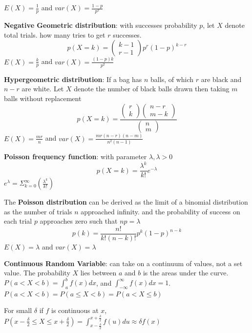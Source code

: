 \documentclass{article}
\begin{document}
\begin{multicols*}{2}
    $E(X) = \frac{1}{p}$ and $var(X) = \frac{1-p}{p^2}$

    \textbf{Negative Geometric distribution}: with successes probability $p$, let $X$ denote total trials. how many tries to get $r$ successes.
    \[
        p(X=k) = \begin{pmatrix}
            k-1 \\
            r-1
        \end{pmatrix} p^r \left( 1-p \right)^{k-r}
    \]
    $E(X) = \frac{k}{p}$ and $var(X) = \frac{(1-p)k}{p^2}$

    \textbf{Hypergeometric distribution}: If a bag has $n$ balls, of which $r$ are black and $n-r$ are white.
    Let $X$ denote the number of black balls drawn then taking $m$ balls without replacement
    \[
        p(X=k) =\frac{ \begin{pmatrix}
                r \\
                k
            \end{pmatrix} \begin{pmatrix}
                n-r \\
                m-k
            \end{pmatrix}}{ \begin{pmatrix}
                n \\
                m
            \end{pmatrix}}
    \]
    $E(X) = \frac{mr}{n}$ and $var(X) = \frac{mr(n-r)(n-m)}{n^2(n-1)}$

    \textbf{Poisson frequency function}: with parameter $\lambda, \lambda > 0$
    \[
        p(X=k) = \frac{\lambda^k}{k!}e^{-\lambda}
    \]
    $e^\lambda = \Sigma^\infty_{k=0} \left(\frac{\lambda^k}{k!}\right)$

    The \textbf{Poisson distribution} can be derived as the limit of a binomial distribution as the number of trials $n$ approached infinity.
    and the probability of success on each trial $p$ approaches zero such that $np=\lambda$
    \[
        p(k) = \frac{n!}{k! (n-k)!} p^k (1-p)^{n-k}
    \]
    $E(X) = \lambda$ and $var(X) = \lambda$

    \textbf{Continuous Random Variable}: can take on a continuum of values, not a set value.
    The probability $X$ lies between $a$ and $b$ is the areas under the curve.
    $P(a < X < b) = \int^b_a f(x)dx$, and  $\int^\infty_{-\infty} f(x)dx = 1$.
    $P(a < X < b) = P(a \leq X < b)  = P(a < X \leq b) $

    For small $\delta$ if $f$ is continuous at $x$, $P(x-\frac{\delta}{2} \leq X \leq x+\frac{\delta}{2}) = \int^{x+\frac{\delta}{2}}_{x-\frac{\delta}{2}}f(u)du \approx \delta f(x)$


\end{multicols*}
\end{document}
